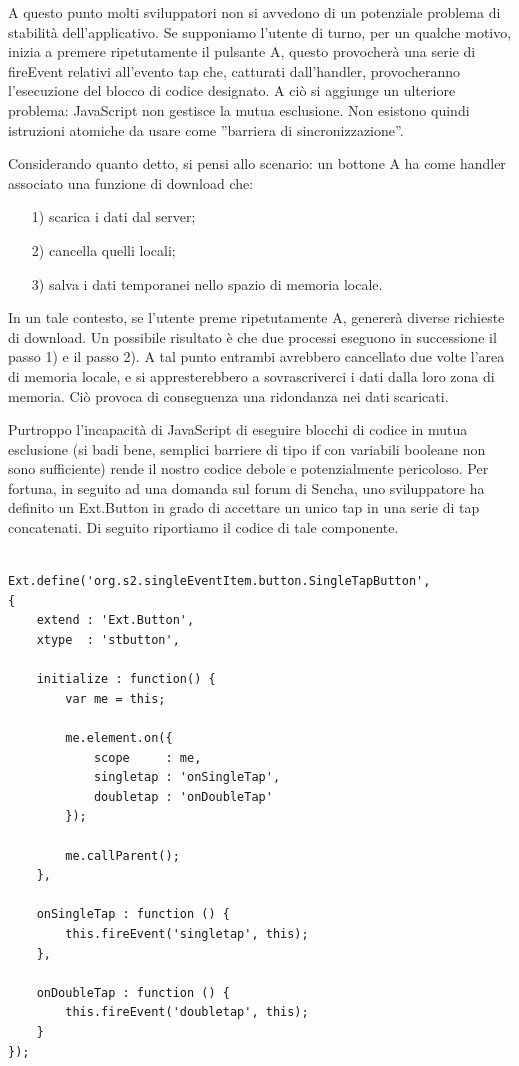 \documentclass[10pt,a4paper,onecolumn]{article}
\begin{document}
A questo punto molti sviluppatori non si avvedono di un potenziale problema di stabilità dell'applicativo. Se supponiamo l'utente di turno, per un qualche motivo, inizia a premere ripetutamente il pulsante A, questo provocherà una serie di fireEvent relativi all'evento tap che, catturati dall'handler, provocheranno l'esecuzione del blocco di codice designato. A ciò si aggiunge un ulteriore problema: JavaScript non gestisce la mutua esclusione. Non esistono quindi istruzioni atomiche da usare come ''barriera di sincronizzazione''.

Considerando quanto detto, si pensi allo scenario: un bottone A ha come handler associato una funzione di download che:

\begin{itemize}
	\item[1)] scarica i dati dal server;
	\item[2)] cancella quelli locali;
	\item[3)] salva i dati temporanei nello spazio di memoria locale.
\end{itemize}

In un tale contesto, se l'utente preme ripetutamente A, genererà diverse richieste di download. Un possibile risultato è che due processi eseguono in successione il passo 1) e il passo 2). A tal punto entrambi avrebbero cancellato due volte l'area di memoria locale, e si appresterebbero a sovrascriverci i dati dalla loro zona di memoria. Ciò provoca di conseguenza una ridondanza nei dati scaricati.

Purtroppo l'incapacità di JavaScript di eseguire blocchi di codice in mutua esclusione (si badi bene, semplici barriere di tipo if con variabili booleane non sono sufficiente) rende il nostro codice debole e potenzialmente pericoloso. Per fortuna, in seguito ad una domanda sul forum di Sencha, uno sviluppatore ha definito un Ext.Button in grado di accettare un unico tap in una serie di tap concatenati. Di seguito riportiamo il codice di tale componente.

\begin{lstlisting}

Ext.define('org.s2.singleEventItem.button.SingleTapButton', 
{
    extend : 'Ext.Button',
    xtype  : 'stbutton',

    initialize : function() {
        var me = this;

        me.element.on({
            scope     : me,
            singletap : 'onSingleTap',
            doubletap : 'onDoubleTap'
        });

        me.callParent();
    },

    onSingleTap : function () {
        this.fireEvent('singletap', this);
    },

    onDoubleTap : function () {
        this.fireEvent('doubletap', this);
    }
});

\end{lstlisting}
\end{document}

